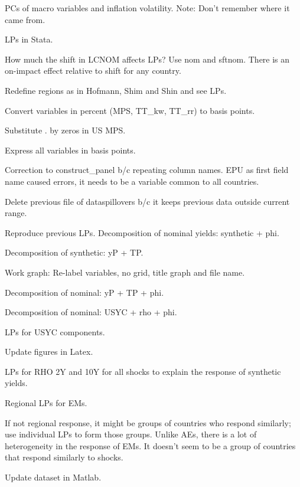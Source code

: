 \documentclass[12pt]{article}
\newcommand{\cmark}{\ding{51}}
\newcommand{\xmark}{\ding{55}}
\newcommand{\done}{\rlap{$\square$}{\raisebox{2pt}{\large\hspace{1pt}\cmark}}%
	\hspace{-2.5pt}}
\newcommand{\wontdo}{\rlap{$\square$}{\large\hspace{1pt}\xmark}}
\begin{document}
\begin{todolist}
\begin{todolist}
		\item[\wontdo] PCs of macro variables and inflation volatility. Note: Don't remember where it came from.
	\end{todolist}
	\item[\done] LPs in Stata.
	\begin{todolist}
		\item[\done] How much the shift in LCNOM affects LPs? Use nom and sftnom. There is an on-impact effect relative to shift for any country.
		\item[\done] Redefine regions as in Hofmann, Shim and Shin and see LPs.
		\item[\done] Convert variables in percent (MPS, TT_kw, TT_rr) to basis points.
		\item[\done] Substitute . by zeros in US MPS.
		\item[\done] Express all variables in basis points.
		\item[\done] Correction to construct_panel b/c repeating column names. EPU as first field name caused errors, it needs to be a variable common to all countries.
		\item[\done] Delete previous file of dataspillovers b/c it keeps previous data outside current range.
		\item[\done] Reproduce previous LPs. Decomposition of nominal yields: synthetic + phi.
		\item[\done] Decomposition of synthetic: yP + TP.
		\item[\done] Work graph: Re-label variables, no grid, title graph and file name.
		\item[\done] Decomposition of nominal: yP + TP + phi.
		\item[\done] Decomposition of nominal: USYC + rho + phi.
		\item[\done] LPs for USYC components.
		\item[\done] Update figures in Latex.
		\item[\done] LPs for RHO 2Y and 10Y for all shocks to explain the response of synthetic yields.
		\item[\done] Regional LPs for EMs.
		\item[\wontdo] If not regional response, it might be groups of countries who respond similarly; use individual LPs to form those groups. Unlike AEs, there is a lot of heterogeneity in the response of EMs. It doesn't seem to be a group of countries that respond similarly to shocks.
	\end{todolist}
	\item[\done] Update dataset in Matlab.

\end{todolist}
\end{document}
